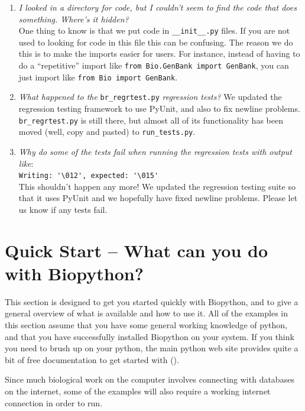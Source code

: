 \documentclass{report}
\begin{document}
\begin{enumerate}
  \item \emph{I looked in a directory for code, but I couldn't seem to find the code that does something. Where's it hidden?} \\
  One thing to know is that we put code in \verb|__init__.py| files. If you are not used to looking for code in this file this can be confusing. The reason we do this is to make the imports easier for users. For instance, instead of having to do a ``repetitive'' import like \verb|from Bio.GenBank import GenBank|, you can just import like \verb|from Bio import GenBank|.

  \item \emph{What happened to the} \verb|br_regrtest.py| \emph{regression tests?}
  We updated the regression testing framework to use PyUnit, and also to fix newline problems. \verb|br_regrtest.py| is still there, but almost all of its functionality has been moved (well, copy and pasted) to \verb|run_tests.py|.

  \item \emph{Why do some of the tests fail when running the regression tests with output like}: \\
\verb|Writing: '\012', expected: '\015'| \\
 This shouldn't happen any more! We updated the regression testing suite so that it uses PyUnit and we hopefully have fixed newline problems. Please let us know if any tests fail.
\end{enumerate}

\chapter{Quick Start -- What can you do with Biopython?}

This section is designed to get you started quickly with Biopython, and to give a general overview of what is available and how to use it. All of the examples in this section assume that you have some general working knowledge of python, and that you have successfully installed Biopython on your system. If you think you need to brush up on your python, the main python web site provides quite a bit of free documentation to get started with (). 

 
Since much biological work on the computer involves connecting with databases on the internet, some of the examples will also require a working internet connection in order to run. 
\end{document}
